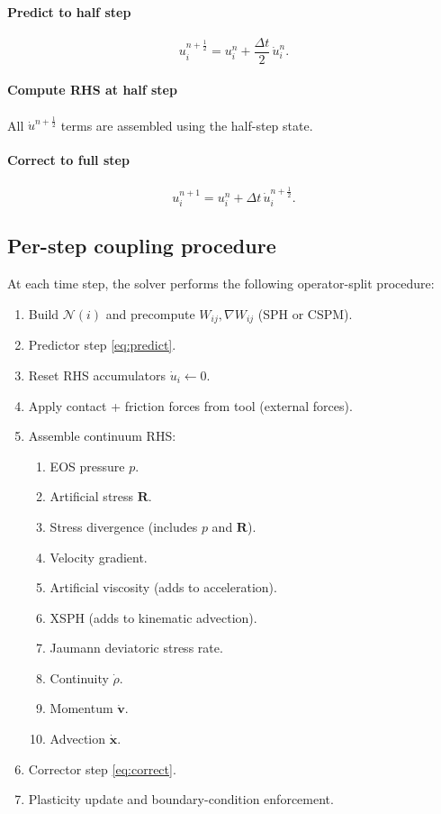 \documentclass[11pt]{article}
\begin{document}
\paragraph{Predict to half step}
\begin{equation}
u_i^{n+\frac12}=u_i^{n}+\frac{\Delta t}{2}\,\dot{u}_i^{n}.
\label{eq:predict}
\end{equation}

\paragraph{Compute RHS at half step}
All $\dot{u}^{n+\frac12}$ terms are assembled using the half-step state.

\paragraph{Correct to full step}
\begin{equation}
u_i^{n+1}=u_i^{n}+\Delta t\,\dot{u}_i^{n+\frac12}.
\label{eq:correct}
\end{equation}

\subsection{Per-step coupling procedure}

At each time step, the solver performs the following operator-split procedure:

\begin{enumerate}
  \item Build $\mathcal{N}(i)$ and precompute $W_{ij},\nabla W_{ij}$ (SPH or CSPM).
  \item Predictor step \eqref{eq:predict}.
  \item Reset RHS accumulators $\dot{u}_i\leftarrow 0$.
  \item Apply contact + friction forces from tool (external forces).
  \item Assemble continuum RHS:
  \begin{enumerate}
    \item EOS pressure $p$.
    \item Artificial stress $\bm{R}$.
    \item Stress divergence (includes $p$ and $\bm{R}$).
    \item Velocity gradient.
    \item Artificial viscosity (adds to acceleration).
    \item XSPH (adds to kinematic advection).
    \item Jaumann deviatoric stress rate.
    \item Continuity $\dot{\rho}$.
    \item Momentum $\dot{\bm{v}}$.
    \item Advection $\dot{\bm{x}}$.
  \end{enumerate}
  \item Corrector step \eqref{eq:correct}.
  \item Plasticity update and boundary-condition enforcement.
\end{enumerate}
\end{document}
